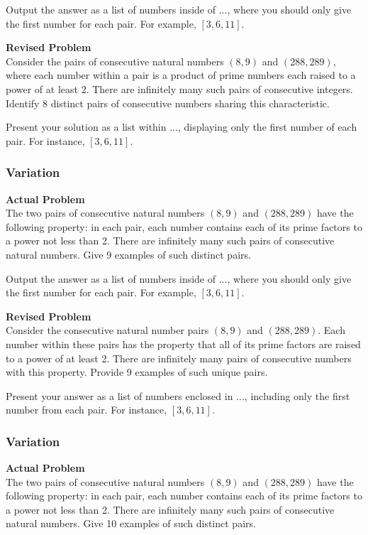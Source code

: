 Output the answer as a list of numbers inside of $\boxed{...}$, where you should only give the first number for each pair. For example, $\boxed{[3, 6, 11]}$.

\textbf{Revised Problem}\\
Consider the pairs of consecutive natural numbers $(8,9)$ and $(288,289)$, where each number within a pair is a product of prime numbers each raised to a power of at least 2. There are infinitely many such pairs of consecutive integers. Identify 8 distinct pairs of consecutive numbers sharing this characteristic.

Present your solution as a list within $\boxed{...}$, displaying only the first number of each pair. For instance, $\boxed{[3, 6, 11]}$.

\subsubsection{Variation}
\textbf{Actual Problem}\\
The two pairs of consecutive natural numbers $(8,9)$ and $(288,289)$ have the following property: in each pair, each number contains each of its prime factors to a power not less than 2. There are infinitely many such pairs of consecutive natural numbers. 
Give 9 examples of such distinct pairs.

Output the answer as a list of numbers inside of $\boxed{...}$, where you should only give the first number for each pair. For example, $\boxed{[3, 6, 11]}$.

\textbf{Revised Problem}\\
Consider the consecutive natural number pairs $(8,9)$ and $(288,289)$. Each number within these pairs has the property that all of its prime factors are raised to a power of at least 2. There are infinitely many pairs of consecutive numbers with this property. Provide 9 examples of such unique pairs.

Present your answer as a list of numbers enclosed in $\boxed{...}$, including only the first number from each pair. For instance, $\boxed{[3, 6, 11]}$.

\subsubsection{Variation}
\textbf{Actual Problem}\\
The two pairs of consecutive natural numbers $(8,9)$ and $(288,289)$ have the following property: in each pair, each number contains each of its prime factors to a power not less than 2. There are infinitely many such pairs of consecutive natural numbers. 
Give 10 examples of such distinct pairs.

